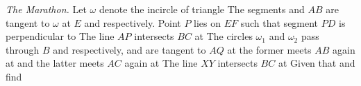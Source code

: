 \textit{The Marathon.}  Let $\omega$ denote the incircle of triangle   The segments   and $AB$ are tangent to $\omega$ at  $E$ and  respectively.  Point $P$ lies on $EF$ such that segment $PD$ is perpendicular to   The line $AP$ intersects $BC$ at   The circles $\omega_1$ and $\omega_2$ pass through $B$ and  respectively, and are tangent to $AQ$ at  the former meets $AB$ again at  and the latter meets $AC$ again at   The line $XY$ intersects $BC$ at   Given that   and  find 